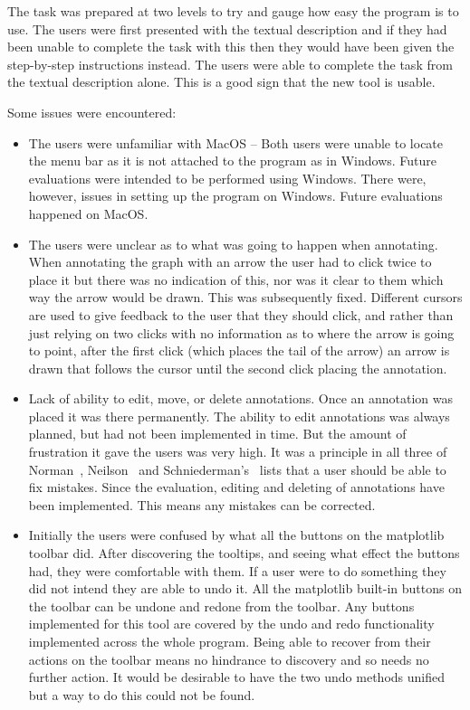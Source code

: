 The task was prepared at two levels to try and gauge how easy the program is to use.  The users were first presented with the textual description and if they had been unable to complete the task with this then they would have been given the step-by-step instructions instead.  The users were able to complete the task from the textual description alone.  This is a good sign that the new tool is usable.

Some issues were encountered:

\begin{itemize}
\item The users were unfamiliar with MacOS -- Both users were unable to locate the menu bar as it is not attached to the program as in Windows.  Future evaluations were intended to be performed using Windows.  There were, however, issues in setting up the program on Windows.  Future evaluations happened on MacOS.
\item The users were unclear as to what was going to happen when annotating.  When annotating the graph with an arrow the user had to click twice to place it but there was no indication of this, nor was it clear to them which way the arrow would be drawn.  This was subsequently fixed. Different cursors are used to give feedback to the user that they should click, and rather than just relying on two clicks with no information as to where the arrow is going to point, after the first click (which places the tail of the arrow) an arrow is drawn that follows the cursor until the second click placing the annotation.
\item Lack of ability to edit, move, or delete annotations. Once an annotation was placed it was there permanently.  The ability to edit annotations was always planned, but had not been implemented in time.  But the amount of frustration it gave the users was very high.  It was a principle in all three of Norman~\cite{normsev}, Neilson~\cite{neilten} and Schniederman's~\cite{shgold} lists that a user should be able to fix mistakes.  Since the evaluation, editing and deleting of annotations have been implemented.  This means any mistakes can be corrected.
\item Initially the users were confused by what all the buttons on the matplotlib toolbar did.  After discovering the tooltips, and seeing what effect the buttons had, they were comfortable with them.  If a user were to do something they did not intend they are able to undo it. All the matplotlib built-in buttons on the toolbar can be undone and redone from the toolbar.  Any buttons implemented for this tool are covered by the undo and redo functionality implemented across the whole program.  Being able to recover from their actions on the toolbar means no hindrance to discovery and so needs no further action.  It would be desirable to have the two undo methods unified but a way to do this could not be found.

\end{itemize}
